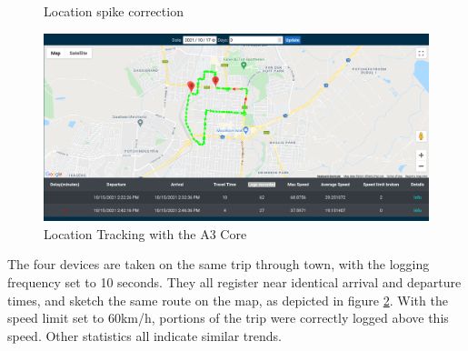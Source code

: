 \begin{figure}[H]
\centering
\caption{Location spike correction}
\label{fig:spike_correction}
\end{figure}

\begin{figure}[H]
\centering
\includegraphics[width=6in]{eval_location.png}
\caption{Location Tracking with the A3 Core}
\label{fig:eval_location}
\end{figure}

The four devices are taken on the same trip through town, with the logging frequency set to 10 seconds.
They all register near identical arrival and departure times, and sketch the same route on the map, as depicted in figure \ref{fig:eval_location}.
With the speed limit set to 60km/h, portions of the trip were correctly logged above this speed.
Other statistics all indicate similar trends.

